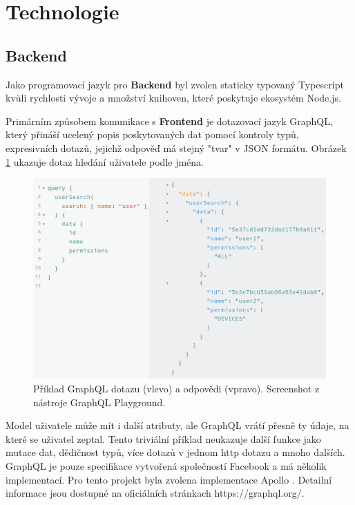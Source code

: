 \section{Technologie}

\subsection{Backend} \label{backend}

Jako programovací jazyk pro \textbf{Backend} byl zvolen staticky typovaný Typescript kvůli rychlosti vývoje
a množství knihoven, které poskytuje ekosystém Node.js.

Primárním způsobem komunikace s \textbf{Frontend}
je dotazovací jazyk GraphQL, který přináší ucelený popis poskytovaných dat pomocí kontroly typů,
expresivních dotazů, jejichž odpověď má stejný "tvar" v JSON formátu.
Obrázek \ref{fig:graphql_example} ukazuje dotaz hledání uživatele podle jména.

\begin{figure} \centering
\includegraphics[width=145mm]{../img/graphql_example.png}
\caption{Příklad GraphQL dotazu (vlevo) a odpovědi (vpravo). Screenshot z nástroje GraphQL Playground.}
\label{fig:graphql_example}
\end{figure}

Model uživatele může mít i další atributy, ale GraphQL vrátí přesně ty údaje, na které se uživatel zeptal.
Tento triviální příklad neukazuje další funkce jako mutace dat, dědičnost typů, více dotazů v jednom http dotazu
a mnoho dalších.
GraphQL je pouze specifikace vytvořená společností Facebook a má několik
implementací. Pro tento projekt byla zvolena implementace Apollo \citep[viz][]{Apollo}. Detailní informace jsou dostupné na oficiálních
stránkach https://graphql.org/.


